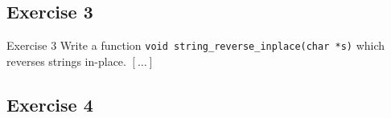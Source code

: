 \documentclass[10pt]{beamer}
\begin{document}
\subsection*{Exercise 3}
\frame{\subsectionpage}
\begin{frame}{Exercise 3}
    Write a function \texttt{void string_reverse_inplace(char *s)} which reverses strings in-place. $[\dots]$ \\ \vspace{0.6cm}
\end{frame}

\subsection*{Exercise 4}
\frame{\subsectionpage}
\end{document}
